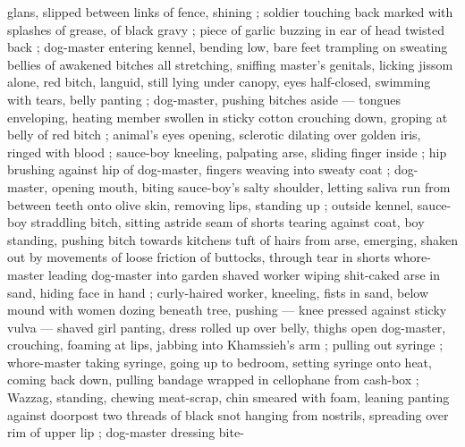 glans, slipped between links of fence, shining ; soldier touching back marked with splashes of grease, of black gravy ; piece of garlic buzzing in ear of head twisted back  ; dog-master entering kennel, bending low, bare feet trampling on sweating bellies of awakened bitches {\col} all stretching, sniffing master's genitals, licking jissom {\col} alone, red bitch, languid, still lying under canopy, eyes half-closed, swimming with tears, belly panting ; dog-master, pushing bitches aside --- tongues enveloping, heating member swollen in sticky cotton {\dashcom} crouching down, groping at belly of red bitch ; animal's eyes opening, sclerotic dilating over golden iris, ringed with blood ; sauce-boy kneeling, palpating arse, sliding finger inside ; hip brushing against hip of dog-master, fingers weaving into sweaty coat ; dog-master, opening mouth, biting sauce-boy's salty shoulder, letting saliva run from between teeth onto olive skin, removing lips, standing up ; outside kennel, sauce-boy straddling bitch, sitting astride {\col} seam of shorts tearing against coat, boy standing, pushing bitch towards kitchens {\col} tuft of hairs from arse, emerging, shaken out by movements of loose friction of buttocks, through tear in shorts {\semislash} whore-master leading dog-master into garden {\col} shaved worker wiping shit-caked arse in sand, hiding face in hand ; curly-haired worker, kneeling, fists in sand, below mound with women dozing beneath tree, pushing --- knee pressed against sticky vulva --- shaved girl panting, dress rolled up over belly, thighs open {\semislash} dog-master, crouching, foaming at lips, jabbing into Khamssieh's arm ; pulling out syringe ; whore-master taking syringe, going up to bedroom, setting syringe onto heat, coming back down, pulling bandage wrapped in cellophane from cash-box ; Wazzag, standing, chewing meat-scrap, chin smeared with foam, leaning panting against doorpost {\col} two threads of black snot hanging from nostrils, spreading over rim of upper lip ; dog-master dressing bite- 
